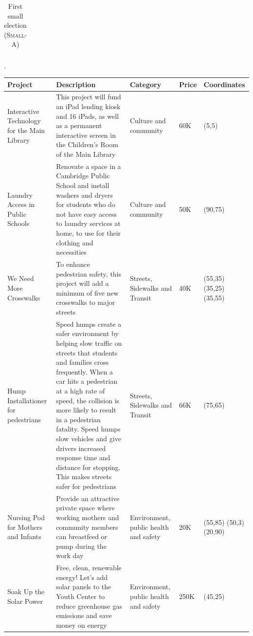\documentclass[letterpaper]{article} %
\begin{document}
\begin{table}[ht!]
\begin{center}
\begin{tabular}{|p{2cm}|p{8cm}|p{3cm}|p{1cm}|p{2cm}|}
     \hline
    \end{tabular}
  \caption{First small election (\textsc{Small-A})}\label{tab:first_elc}.
  \end{center}
\end{table}

\clearpage
\begin{table}[ht!]
  \begin{center}
    \begin{tabular}{|p{2cm}|p{8cm}|p{3cm}|p{1cm}|p{2cm}|}
    \hline
    \textbf{Project} & \textbf{Description} & \textbf{Category} & \textbf{Price} & \textbf{Coordinates}\\
    \hline
    Interactive Technology for the Main Library & This project will fund an iPad lending kiosk and 16 iPads, as well as a permanent interactive screen in the Children’s Room of the Main Library & Culture and community & 60K & (5,5)\\
    \hline
    Laundry Access in Public Schools & Renovate a space in a Cambridge Public School and install washers and dryers for students who do not have easy access to laundry services at home, to use for their clothing and necessities & Culture and community & 50K & (90,75)\\
    \hline
    We Need More Crosswalks & To enhance pedestrian safety, this project will add a minimum of five new crosswalks to major streets & Streets, Sidewalks and Transit &  40K & (55,35) (35,25) (35,55)\\
    \hline
    Hump Installationer for pedestrians & Speed humps create a safer environment by helping slow traffic on streets that students and families cross frequently. When a car hits a pedestrian at a high rate of speed, the collision is more likely to result in a pedestrian fatality. Speed humps slow vehicles and give drivers increased response time and distance for stopping. This makes streets safer for pedestrians & Streets, Sidewalks and Transit & 66K & (75,65)\\
    \hline
    Nursing Pod for Mothers and Infants & Provide an attractive private space where working mothers and community members can breastfeed or pump during the work day & Environment, public health and safety & 20K & (55,85) (50,3) (20,90)\\
    \hline
    Soak Up the Solar Power & Free, clean, renewable energy! Let’s add solar panels to the Youth Center to reduce greenhouse gas emissions and save money on energy & Environment, public health and safety & 250K & (45,25)\\

\end{tabular}
\end{center}
\end{table}
\end{document}
